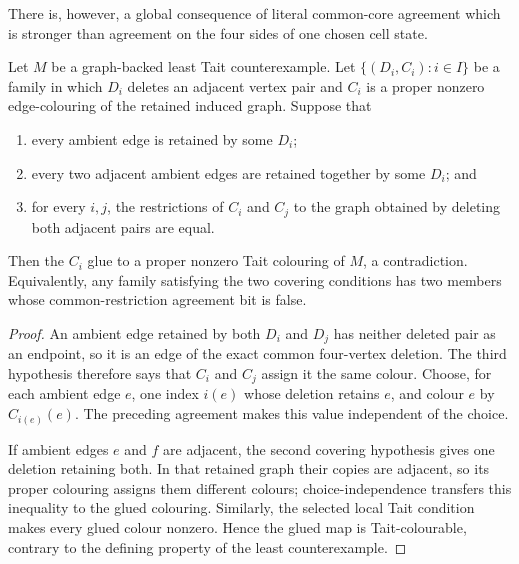 There is, however, a global consequence of literal common-core agreement
which is stronger than agreement on the four sides of one chosen cell state.

\begin{lemma}
\label{lem:global-common-core-colouring-atlas}
Let \(M\) be a graph-backed least Tait counterexample.  Let
\(\{(D_i,C_i):i\in I\}\) be a family in which \(D_i\) deletes an adjacent
vertex pair and \(C_i\) is a proper nonzero edge-colouring of the retained
induced graph.  Suppose that
\begin{enumerate}
\item every ambient edge is retained by some \(D_i\);
\item every two adjacent ambient edges are retained together by some
      \(D_i\); and
\item for every \(i,j\), the restrictions of \(C_i\) and \(C_j\) to the
      graph obtained by deleting both adjacent pairs are equal.
\end{enumerate}
Then the \(C_i\) glue to a proper nonzero Tait colouring of \(M\), a
contradiction.  Equivalently, any family satisfying the two covering
conditions has two members whose common-restriction agreement bit is false.
\end{lemma}

\begin{proof}
An ambient edge retained by both \(D_i\) and \(D_j\) has neither deleted
pair as an endpoint, so it is an edge of the exact common four-vertex
deletion.  The third hypothesis therefore says that \(C_i\) and \(C_j\)
assign it the same colour.  Choose, for each ambient edge \(e\), one index
\(i(e)\) whose deletion retains \(e\), and colour \(e\) by \(C_{i(e)}(e)\).
The preceding agreement makes this value independent of the choice.

If ambient edges \(e\) and \(f\) are adjacent, the second covering
hypothesis gives one deletion retaining both.  In that retained graph their
copies are adjacent, so its proper colouring assigns them different colours;
choice-independence transfers this inequality to the glued colouring.
Similarly, the selected local Tait condition makes every glued colour
nonzero.  Hence the glued map is Tait-colourable, contrary to the defining
property of the least counterexample.
\end{proof}

